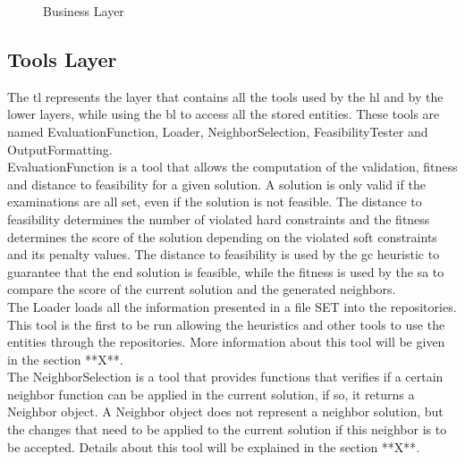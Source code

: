 \begin{figure}[t!]
\caption{Business Layer} \label{fig:BusinessLayer}
\end{figure}

\subsection{Tools Layer}
The \gls{tl} represents the layer that contains all the tools used by the \gls{hl} and by the lower layers, while using the \gls{bl} to access all the stored entities. These tools are named EvaluationFunction, Loader, NeighborSelection, FeasibilityTester and OutputFormatting.\\

EvaluationFunction is a tool that allows the computation of the validation, fitness and distance to feasibility for a given solution. A solution is only valid if the examinations are all set, even if the solution is not feasible. The distance to feasibility determines the number of violated hard constraints and the fitness determines the score of the solution depending on the violated soft constraints and its penalty values. The distance to feasibility is used by the \gls{gc} heuristic to guarantee that the end solution is feasible, while the fitness is used by the \gls{sa} to compare the score of the current solution and the generated neighbors.\\

The Loader loads all the information presented in a file SET into the repositories. This tool is the first to be run allowing the heuristics and other tools to use the entities through the repositories. More information about this tool will be given in the {\color{red}section **X**}.\\

The NeighborSelection is a tool that provides functions that verifies if a certain neighbor function can be applied in the current solution, if so, it returns a Neighbor object. A Neighbor object does not represent a neighbor solution, but the changes that need to be applied to the current solution if this neighbor is to be accepted. Details about this tool will be explained in the {\color{red}section **X**}.\\

